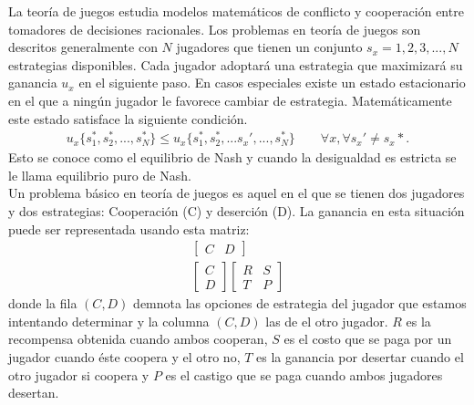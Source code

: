 \documentclass[portrait, a0b,final]{a0poster}%
\numberwithin{equation}{section}
\newenvironment{poster}{
  \begin{center}
  \begin{minipage}[c]{0.98\textwidth}
}{
  \end{minipage}
  \end{center}
}
\newenvironment{pcolumn}[1]{
  \begin{minipage}{#1\textwidth}
  \begin{center}
}{
  \end{center}
  \end{minipage}
}
\newcommand{\pbox}[4]{
\psshadowbox[#3]{
\begin{minipage}[t][#2][t]{#1}
#4
\end{minipage}
}}
\begin{document}
\begin{poster}
\begin{center}
\begin{pcolumn}{0.32}
{%
\vspace{2cm}
    \begin{center}
        \pbox{0.8\textwidth}{}%
        {linewidth=2mm,framearc=0.1,linecolor=lightblue,fillstyle=gradient,gradangle=0,%
        gradbegin=white,gradend=whiteblue,gradmidpoint=1.0,framesep=1em}{%
        \begin{center}
           Teor\'ia de Juegos 
        \end{center}}
    \end{center}
    \vspace{1.25cm}
\setcounter{section}{4}%
\setcounter{equation}{0}%
La teor\'ia de juegos estudia modelos matem\'aticos de conflicto y cooperaci\'on entre tomadores de decisiones racionales. Los problemas en teor\'ia de juegos son descritos generalmente con $N$ jugadores que tienen un conjunto $s_x = {1,2,3,...,N}$ estrategias disponibles. Cada jugador adoptar\'a una estrategia que maximizar\'a su ganancia $u_x$ en el siguiente paso. En casos especiales existe un estado estacionario en el que a ning\'un jugador le favorece cambiar de estrategia. Matem\'aticamente este estado satisface la siguiente condici\'on.
%
\begin{eqnarray}
  u_x \{s_1^*, s_2^*, ..., s_N^*\} \leq u_x\{s_1^*, s_2^*, ...s_x',..., s_N^*\} \qquad \forall x, \forall s_x' \neq s_x*.
\end{eqnarray}%
Esto se conoce como el equilibrio de Nash y cuando la desigualdad es estricta se le llama equilibrio puro de Nash.\\

Un problema b\'asico en teor\'ia de juegos es aquel en el que se tienen dos jugadores y dos estrategias: Cooperaci\'on (C) y deserci\'on (D). La ganancia en esta situaci\'on puede ser representada usando esta matriz:
%
\begin{eqnarray}
\begin{bmatrix}
  C & D
\end{bmatrix} \\ \nonumber
\begin{bmatrix}
  C\\
  D
\end{bmatrix}\nonumber
\begin{bmatrix}
  R & S\\
  T & P
\end{bmatrix}\label{matrizNash}
\end{eqnarray}
%
donde la fila $(C,D)$ demnota las opciones de estrategia del jugador que estamos intentando determinar y la columna $(C, D)$ las de el otro jugador. $R$ es la recompensa obtenida cuando ambos cooperan, $S$ es el costo que se paga por un jugador cuando \'este coopera y el otro no, $T$ es la ganancia por desertar cuando el otro jugador si coopera y $P$ es el castigo que se paga cuando ambos jugadores desertan.

}
\end{pcolumn}
\end{center}
\end{poster}
\end{document}
